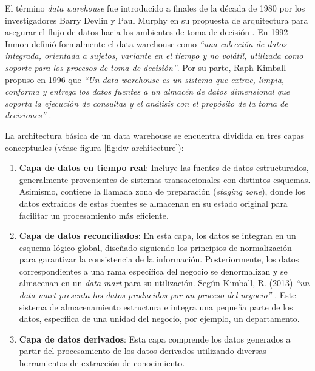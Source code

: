     El término \textit{data warehouse} fue introducido a finales de la década de 1980 por los investigadores Barry Devlin y Paul Murphy en
    su propuesta de arquitectura para asegurar el flujo de datos hacia los ambientes de toma de decisión \cite{Devlin1988AnAF}. En 1992 Inmon \cite{inmon1992building} definió formalmente
    el data warehouse como \textit{``una colección de datos integrada, orientada a sujetos, variante en el tiempo y no volátil, utilizada como soporte para los procesos de toma de decisión''}.
    Por su parte, Raph Kimball propuso en 1996 que \textit{``Un data warehouse es un sistema que extrae, limpia, conforma y entrega los datos fuentes a un almacén de datos dimensional que soporta la ejecución de consultas y el análisis con el propósito de la toma de decisiones''} \cite{kimball1996data}.

    La architectura básica de un data warehouse se encuentra dividida en tres capas conceptuales \cite{kimball2013data,jameel2022analyses,nambiar2022overview} (véase figura \ref{fig:dw-architecture}):

    \begin{enumerate}
        \item \textbf{Capa de datos en tiempo real}: Incluye las fuentes de datos estructurados, 
        generalmente provenientes de sistemas transaccionales con distintos esquemas. 
        Asimismo, contiene la llamada zona de preparación (\textit{staging zone}), 
        donde los datos extraídos de estas fuentes se almacenan en su estado original 
        para facilitar un procesamiento más eficiente.
        \item \textbf{Capa de datos reconciliados}: 
        En esta capa, los datos se integran en un esquema lógico global, 
        diseñado siguiendo los principios de normalización para garantizar la consistencia de la información. 
        Posteriormente, los datos correspondientes a una rama específica del negocio se denormalizan 
        y se almacenan en un \textit{data mart} para su utilización.
        Según Kimball, R. (2013) \textit{``un data mart presenta los datos producidos por un proceso del negocio''} \cite{kimball2013data}.
        Este sistema de almacenamiento 
        estructura e integra una pequeña parte de los datos,
        específica de una unidad del negocio, por ejemplo, un departamento.
        \item \textbf{Capa de datos derivados}: Esta capa comprende los datos generados
        a partir del procesamiento de los datos derivados utilizando diversas herramientas de extracción de conocimiento.
    \end{enumerate}

